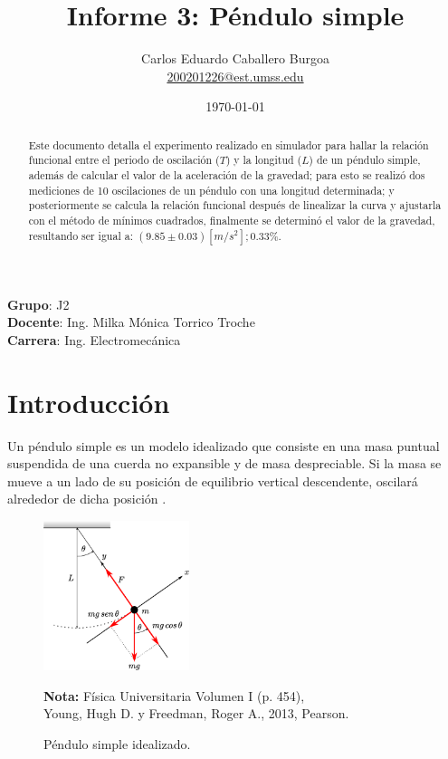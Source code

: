 \documentclass[letter,11pt]{article}
\title{Informe 3: Péndulo simple}
\author{Carlos Eduardo Caballero Burgoa \\
    \small{\href{mailto:200201226@est.umss.edu}{200201226@est.umss.edu}}
}
\date{\today}
\newcommand{\source}[1]{\vspace{-11pt} \caption*{\small{\textbf{Nota:} {#1}}}}
\begin{document}
\maketitle
\begin{center}
    \textbf{Grupo}: J2\\
    \textbf{Docente}: Ing. Milka Mónica Torrico Troche\\
    \textbf{Carrera}: Ing. Electromecánica
\end{center}

\begin{abstract}
Este documento detalla el experimento realizado en simulador para hallar la
relación funcional entre el periodo de oscilación ($T$) y la longitud ($L$) de
un péndulo simple, además de calcular el valor de la aceleración de la gravedad;
para esto se realizó dos mediciones de 10 oscilaciones de un péndulo con una
longitud determinada; y posteriormente se calcula la relación funcional después
de linealizar la curva y ajustarla con el método de mínimos cuadrados,
finalmente se determinó el valor de la gravedad, resultando ser igual a:
$(9.85 \pm 0.03)[m/s^2]; 0.33\%$.
\end{abstract}

\section{Introducción}

Un péndulo simple es un modelo idealizado que consiste en una masa puntual
suspendida de una cuerda no expansible y de masa despreciable. Si la masa se
mueve a un lado de su posición de equilibrio vertical descendente, oscilará
alrededor de dicha posición \cite{Young&Freedman}.

\begin{figure}
\centering
\includegraphics[width=0.38\textwidth]{resources/f1.eps}
\caption{Péndulo simple idealizado.}
\label{figura1}
\source{Física Universitaria Volumen I (p. 454), \\
Young, Hugh D. y Freedman, Roger A., 2013, Pearson.}
\end{figure}
\end{document}
